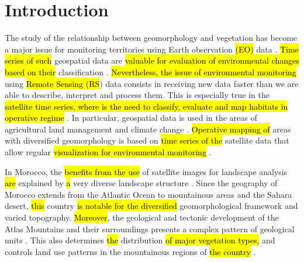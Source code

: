 \documentclass[geomatics,article,submit,pdftex,moreauthors]{Definitions/mdpi}
\begin{document}
\section{Introduction}

The study of the relationship between geomorphology and vegetation has become a major issue for monitoring territories using Earth observation \hl{(EO)} data \cite{Corenblit,Muir,Pu,Cary01091990}. \hl{Time series of such} geospatial data are \hl{valuable for evaluation of environmental changes based on their} classification \cite{rs15225374,w17010068,app15010338}. \hl{Nevertheless, the issue of environmental monitoring} using \hl{Remote Sensing (RS}) data consists in receiving new data faster than we are able to describe, interpret and process them. This is especially true in the \hl{satellite time series, where is the need to classify, evaluate and map habitats in operative regime} \cite{rs15225413,rs15225408,rs15225415}. In particular, geospatial data is used in the areas of agricultural land management and climate change \cite{Ahmadian03052016,Lemenkova202412,IMTIAZ2024109172}. \hl{Operative mapping of} areas with diversified geomorphology is based on \hl{time series of the }satellite data that allow\hl{ }regular \hl{visualization for environmental monitoring} \cite{JOHANSSON01011978,rs9121306}.  

In Morocco, the \hl{benefits from the use} of satellite images for landscape analysis \hl{are} explained by \hl{a} very diverse landscape structure \cite{Sahrane13122022,Marco04032021,Aouraghe01032010}. Since the geography of Morocco extends from the Atlantic Ocean to mountainous areas and the Sahara desert, \hl{this} country \hl{is notable for the diversified }geomorphological framework and varied topography. \hl{Moreover}, the geological and tectonic development of the Atlas Mountains and their surroundings presents a complex pattern of geological units \cite{Benvenuti31122024,Ouallali03072020,Khalloufi01032010}. This also determines \hl{the} distribution \hl{of major vegetation types,} and controls land use patterns in the mountainous regions of \hl{the country} \cite{ALIELOMAIRI2024101321}. 
\end{document}
